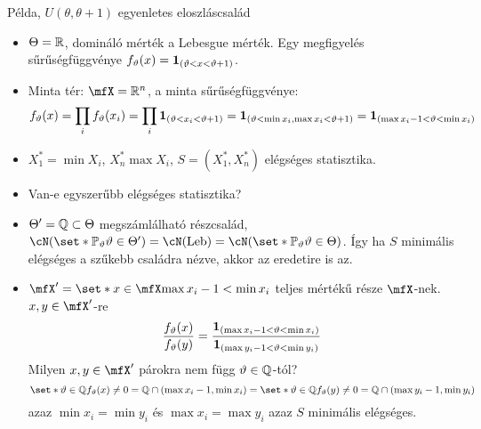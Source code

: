 \documentclass[aspectratio=169,notheorems,9pt,\option]{beamer}
\begin{document}
\begin{frame}{Példa, $U(\theta,\theta+1)$ egyenletes eloszláscsalád}
  \begin{itemize}
    \item $\Theta=\mathbb{R}$, domináló mérték a Lebesgue mérték. 
    Egy megfigyelés sűrűségfüggvénye $f_{\theta}(x)=\I{\theta<x<\theta+1}$.
    \item Minta tér: $\mfX=\real^n$, a minta sűrűségfüggvénye:
    \begin{displaymath}
      f_\theta(x)=\prod_i f_\theta(x_i)
      =\prod_i\I{\theta<x_i<\theta+1}
      =\I{\theta<\min x_i,\max x_i<\theta+1}
      =\I{\max x_i-1<\theta<\min x_i}
    \end{displaymath}
    \item $X_1^*=\min X_i$, $X_n^*\max X_i$, $S=(X_1^*,X_n^*)$ elégséges statisztika.
    \item Van-e egyszerűbb elégséges statisztika?
    \item $\Theta'=\mathbb{Q}\subset\Theta$ megszámlálható részcsalád, 
    $\cN(\set*{\P[\theta]}{\theta\in\Theta'})=\cN(\Leb)=\cN(\set*{\P[\theta]}{\theta\in \Theta})$. 
    Így ha $S$ minimális  elégséges a szűkebb családra nézve, akkor az eredetire is az.
    \item $\mfX'=\set*{x\in\mfX}{\max x_i-1<\min x_i}$ teljes mértékű része $\mfX$-nek. $x,y\in\mfX'$-re
    \begin{displaymath}
      \frac{f_\theta(x)}{f_\theta(y)}=\frac{\I{\max x_i-1<\theta <\min x_i}}{\I{\max y_i-1<\theta<\min y_i}}  
    \end{displaymath}
    Milyen $x,y\in\mfX'$ párokra nem függ $\vartheta\in\mathbb{Q}$-tól? 
    \begin{displaymath}
      \set*{\theta\in\Q}{f_{\theta}(x)\neq0}=\Q\cap(\max x_i-1,\min x_i)=
      \set*{\theta\in\Q}{f_{\theta}(y)\neq0}=\Q\cap(\max y_i-1,\min y_i)
    \end{displaymath}
    azaz $\min x_i=\min y_i$ és $\max x_i=\max y_i$ azaz $S$ minimális elégséges.
    \end{itemize}
\end{frame}
\end{document}
